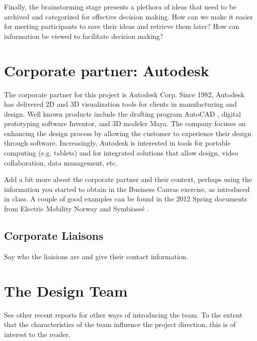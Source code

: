 Finally, the brainstorming stage presents a plethora of ideas that need to be archived and categorized for effective decision making. How can we make it easier for meeting participants to save their ideas and retrieve them later? How can information be viewed to facilitate decision making?

\section{Corporate partner: Autodesk}

The corporate partner for this project is Autodesk Corp.
Since 1982, Autodesk has delivered 2D and 3D visualization tools for clients in manufacturing and design. Well known products include the drafting program AutoCAD
, digital prototyping software Inventor, and 3D modeler Maya. The company focuses on enhancing the design process by allowing the customer to experience their design through software. Increasingly, Autodesk is interested in 
tools for portable computing (e.g. tablets) and for integrated solutions that allow design, video collaboration, data management, etc.

\begin{remark} \color{blue}
Add a bit more about the corporate partner and their context, perhaps using the information you started to obtain in the Business 
Canvas exercise, as introduced in class. A couple of good examples can be found in the 2012 Spring documents from Electric Mobility Norway \cite{EMN2012Spring} and Symbiose\'{e} \cite{Symbiosee2012Spring}.
\normalcolor \end{remark}

\subsection{Corporate Liaisons}
Say who the liaisions are and give their contact information.


\section{The Design Team}
\label{sec:team}

\begin{remark} \color{blue}
See other recent reports for other ways of introducing the team. To the extent that the characteristics of the team influence the project direction, this is of interest to the reader.
\end{remark} \normalcolor

